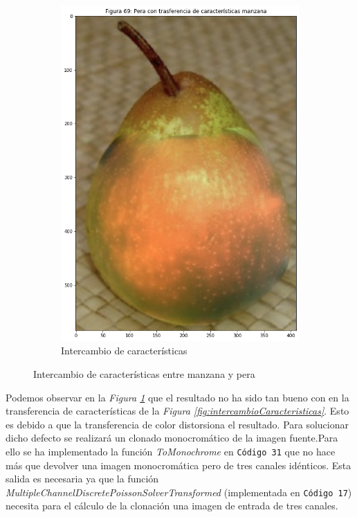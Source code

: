 \documentclass[11pt,twoside,titlepage,a4paper]{article}
\numberwithin{equation}{section} %
\theoremstyle{usual}
\begin{document}
\begin{figure}[h]
\begin{subfigure}[t]{.24\textwidth}
        \includegraphics[width=\textwidth]{imagenes/PoissonImageEditing_cell_77_output_4.png}
        \caption{Intercambio de características}
        \label{fig:intercambioManzanaPera}
    \end{subfigure}
    \caption{Intercambio de características entre manzana y pera}
    \label{fig:manzanaPeraIntercambioCaracteristicas}
\end{figure}

Podemos observar en la \textit{Figura \ref{fig:intercambioManzanaPera}} que el resultado no ha sido tan bueno con en la transferencia de características de la \textit{Figura \ref{fig:intercambioCaracteristicas}}. Esto es debido a que la transferencia de color distorsiona el resultado. Para solucionar dicho defecto se realizará un clonado monocromático de la imagen fuente.Para ello se ha implementado la función \textit{ToMonochrome} en \texttt{Código 31} que no hace más que devolver una imagen monocromática pero de tres canales idénticos. Esta salida es necesaria ya que la función \textit{MultipleChannelDiscretePoissonSolverTransformed} (implementada en \texttt{Código 17}) necesita para el cálculo de la clonación una imagen de entrada de tres canales. 
\end{document}
